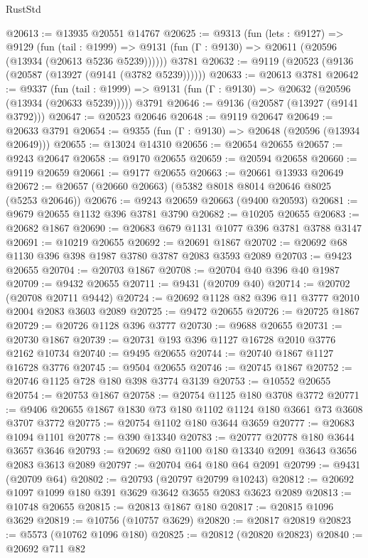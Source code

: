 \begin{lexlean}{RustStd}
\begin{coremodule}
@20613 := @13935 @20551 @14767
@20625 := @9313
    (fun (lets : @9127) =>
    @9129
      (fun (tail : @1999) =>
      @9131 (fun (Γ : @9130) => @20611 (@20596 (@13934 (@20613 @5236 @5239))))))
    @3781
@20632 := @9119 (@20523 (@9136 (@20587 (@13927 (@9141 (@3782 @5239))))))
@20633 := @20613 @3781
@20642 := @9337
    (fun (tail : @1999) => @9131 (fun (Γ : @9130) => @20632 (@20596 (@13934 (@20633 @5239)))))
    @3791
@20646 := @9136 (@20587 (@13927 (@9141 @3792)))
@20647 := @20523 @20646
@20648 := @9119 @20647
@20649 := @20633 @3791
@20654 := @9355 (fun (Γ : @9130) => @20648 (@20596 (@13934 @20649)))
@20655 := @13024 @14310
@20656 := @20654 @20655
@20657 := @9243 @20647
@20658 := @9170 @20655
@20659 := @20594 @20658
@20660 := @9119 @20659
@20661 := @9177 @20655
@20663 := @20661 @13933 @20649
@20672 := @20657 (@20660 @20663) (@5382 @8018 @8014 @20646 @8025 (@5253 @20646))
@20676 := @9243 @20659 @20663 (@9400 @20593)
@20681 := @9679 @20655 @1132 @396 @3781 @3790
@20682 := @10205 @20655
@20683 := @20682 @1867
@20690 := @20683 @679 @1131 @1077 @396 @3781 @3788 @3147
@20691 := @10219 @20655
@20692 := @20691 @1867
@20702 := @20692 @68 @1130 @396 @398 @1987 @3780 @3787 @2083 @3593 @2089
@20703 := @9423 @20655
@20704 := @20703 @1867
@20708 := @20704 @40 @396 @40 @1987
@20709 := @9432 @20655
@20711 := @9431 (@20709 @40)
@20714 := @20702 (@20708 @20711 @9442)
@20724 := @20692 @1128 @82 @396 @11 @3777 @2010 @2004 @2083 @3603 @2089
@20725 := @9472 @20655
@20726 := @20725 @1867
@20729 := @20726 @1128 @396 @3777
@20730 := @9688 @20655
@20731 := @20730 @1867
@20739 := @20731 @193 @396 @1127 @16728 @2010 @3776 @2162 @10734
@20740 := @9495 @20655
@20744 := @20740 @1867 @1127 @16728 @3776
@20745 := @9504 @20655
@20746 := @20745 @1867
@20752 := @20746 @1125 @728 @180 @398 @3774 @3139
@20753 := @10552 @20655
@20754 := @20753 @1867
@20758 := @20754 @1125 @180 @3708 @3772
@20771 := @9406 @20655 @1867 @1830 @73 @180 @1102 @1124 @180 @3661 @73 @3608 @3707 @3772
@20775 := @20754 @1102 @180 @3644 @3659
@20777 := @20683 @1094 @1101
@20778 := @390 @13340
@20783 := @20777 @20778 @180 @3644 @3657 @3646
@20793 := @20692 @80 @1100 @180 @13340 @2091 @3643 @3656 @2083 @3613 @2089
@20797 := @20704 @64 @180 @64 @2091
@20799 := @9431 (@20709 @64)
@20802 := @20793 (@20797 @20799 @10243)
@20812 := @20692 @1097 @1099 @180 @391 @3629 @3642 @3655 @2083 @3623 @2089
@20813 := @10748 @20655
@20815 := @20813 @1867 @180
@20817 := @20815 @1096 @3629
@20819 := @10756 (@10757 @3629)
@20820 := @20817 @20819
@20823 := @5573 (@10762 @1096 @180)
@20825 := @20812 (@20820 @20823)
@20840 := @20692
    @711
    @82

\end{coremodule}
\end{lexlean}
